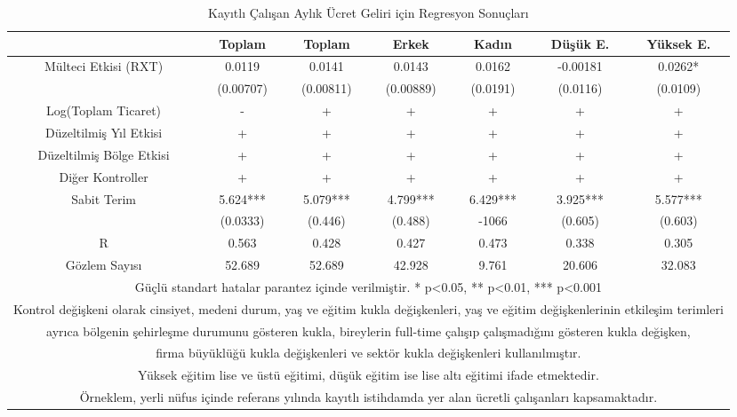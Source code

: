 \documentclass{article}
\begin{document}
\begin{justify}
        \FloatBarrier
        \begin{table}[h]
            \centering
            \caption{Kayıtlı Çalışan Aylık Ücret Geliri için Regresyon Sonuçları}
            \begin{tabular}{|ccccccc|}
                \hline
                     & Toplam & Toplam & Erkek & Kadın & Düşük E. & Yüksek E. \\ \hline
                     Mülteci Etkisi (RXT) & 0.0119 & 0.0141 & 0.0143 & 0.0162 & -0.00181 & 0.0262*   \\ 
                     & (0.00707) & (0.00811) & (0.00889) & (0.0191) & (0.0116) & (0.0109)    \\
                    Log(Toplam Ticaret) & - & + & + & + & + & + \\ 
                    Düzeltilmiş Yıl Etkisi & + & + & + & + & + & + \\ 
                    Düzeltilmiş Bölge Etkisi & + & + & + & + & + & + \\ 
                    Diğer Kontroller & + & + & + & + & + & + \\
                    Sabit Terim & 5.624*** & 5.079*** & 4.799*** & 6.429*** & 3.925*** & 5.577*** \\ 
                    & (0.0333) & (0.446) & (0.488) & -1066 & (0.605) & (0.603)    \\ 
                    R & 0.563 & 0.428 & 0.427 & 0.473 & 0.338 & 0.305    \\ 
                    Gözlem Sayısı & 52.689 & 52.689 & 42.928 & 9.761 & 20.606 & 32.083 \\ \hline
                    \multicolumn{7}{|c|}{\scriptsize Güçlü standart hatalar parantez içinde verilmiştir.   * p<0.05, ** p<0.01, *** p<0.001}\\ \hline
                    \multicolumn{7}{|c|}{\scriptsize Kontrol değişkeni olarak cinsiyet, medeni durum, yaş ve eğitim kukla değişkenleri, yaş ve eğitim değişkenlerinin etkileşim terimleri} \\ 
                    \multicolumn{7}{|c|}{\scriptsize ayrıca bölgenin şehirleşme durumunu gösteren kukla, bireylerin full-time çalışıp çalışmadığını gösteren kukla değişken,} \\
                    \multicolumn{7}{|c|}{\scriptsize firma büyüklüğü kukla değişkenleri ve sektör kukla değişkenleri kullanılmıştır. } \\ \hline
                    \multicolumn{7}{|c|}{\scriptsize Yüksek eğitim lise ve üstü eğitimi, düşük eğitim ise lise altı eğitimi ifade etmektedir.} \\ \hline
                    \multicolumn{7}{|c|}{\scriptsize Örneklem, yerli nüfus içinde referans yılında kayıtlı istihdamda yer alan ücretli çalışanları kapsamaktadır.} \\ \hline

                \end{tabular}
        \end{table}
        \FloatBarrier    









    \end{justify}
\end{document}
